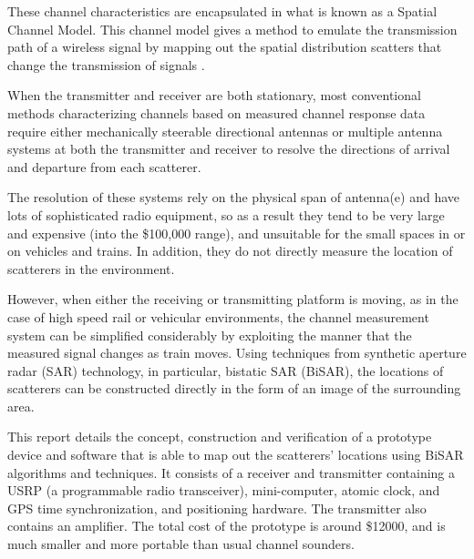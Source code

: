 These channel characteristics are encapsulated in what is known as a Spatial Channel Model. This channel model gives  a method to emulate the transmission path of a wireless signal by mapping out the spatial distribution scatters that change the transmission of signals \cite{doppler_focussing}.

When the transmitter and receiver are both stationary, most conventional methods characterizing channels based on measured channel response data require either mechanically steerable directional antennas or multiple antenna systems at both the transmitter and receiver to resolve the directions of arrival and departure from each scatterer.

The resolution of these systems rely on the physical span of antenna(e) and have lots of sophisticated radio equipment, so as a result they tend to be very large and expensive (into the \$100,000 range), and unsuitable for the small spaces in or on vehicles and trains. In addition, they do not directly measure the location of scatterers in the environment.

However, when either the receiving or transmitting platform is moving, as in the case of high speed rail or vehicular environments, the channel measurement system can be simplified considerably by exploiting the manner that the measured signal changes as train moves. Using techniques from synthetic aperture radar (SAR) technology, in particular, bistatic SAR (BiSAR), the locations of scatterers can be constructed directly in the form of an image of the surrounding area.

This report details the concept, construction and verification of a prototype device and software that is able to map out the scatterers' locations using BiSAR algorithms and techniques. It consists of a receiver and transmitter containing a USRP (a programmable radio transceiver), mini-computer, atomic clock, and GPS time synchronization, and positioning hardware. The transmitter also contains an amplifier. The total cost of the prototype is around \$12000, and is much smaller and more portable than usual channel sounders.